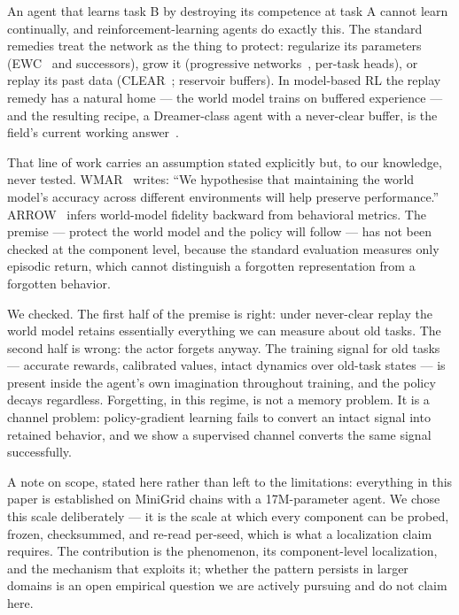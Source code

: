 \documentclass[10pt]{article}
\begin{document}
An agent that learns task B by destroying its competence at task A cannot learn continually,
and reinforcement-learning agents do exactly this. The standard remedies treat the network as
the thing to protect: regularize its parameters (EWC~\cite{kirkpatrick2017overcoming} and
successors), grow it (progressive networks~\cite{rusu2016progressive}, per-task heads), or
replay its past data (CLEAR~\cite{rolnick2019experience}; reservoir buffers). In model-based
RL the replay remedy has a natural home --- the world model trains on buffered experience ---
and the resulting recipe, a Dreamer-class agent with a never-clear buffer, is the field's
current working answer~\cite{kessler2023effectiveness,yang2024augmenting,alyahya2026arrow}.

That line of work carries an assumption stated explicitly but, to our knowledge, never
tested. WMAR~\cite{yang2024augmenting} writes: ``We hypothesise that maintaining the world
model's accuracy across different environments will help preserve performance.''
ARROW~\cite{alyahya2026arrow} infers world-model fidelity backward from behavioral metrics.
The premise --- protect the world model and the policy will follow --- has not been checked
at the component level, because the standard evaluation measures only episodic return, which
cannot distinguish a forgotten representation from a forgotten behavior.

We checked. The first half of the premise is right: under never-clear replay the world model
retains essentially everything we can measure about old tasks. The second half is wrong: the
actor forgets anyway. The training signal for old tasks --- accurate rewards, calibrated
values, intact dynamics over old-task states --- is present inside the agent's own
imagination throughout training, and the policy decays regardless. Forgetting, in this
regime, is not a memory problem. It is a channel problem: policy-gradient learning fails to
convert an intact signal into retained behavior, and we show a supervised channel converts
the same signal successfully.

A note on scope, stated here rather than left to the limitations: everything in this paper is
established on MiniGrid chains with a 17M-parameter agent. We chose this scale deliberately ---
it is the scale at which every component can be probed, frozen, checksummed, and re-read
per-seed, which is what a localization claim requires. The contribution is the phenomenon, its
component-level localization, and the mechanism that exploits it; whether the pattern persists
in larger domains is an open empirical question we are actively pursuing and do not claim
here.
\end{document}
